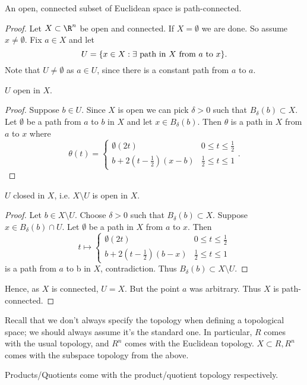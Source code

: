 \begin{proposition}                       %
An open, connected subset of Euclidean space is path-connected.
\end{proposition}
\begin{proof}
Let $X\subset \R^n$ be open and connected. If $X = \emptyset$ we are done. So assume $x\neq \emptyset$. Fix $a\in X$ and let \[ U = \{x\in X : \exists \textup{ path in } X \textup{ from } a \textup{ to } x\}. \]
Note that $U\neq \emptyset$ as $a\in U$, since  there is a constant path from $a$ to $a$.

\begin{claim}
    $U$ open in $X$.
\end{claim} 
\begin{proof}
Suppose $b\in U$. Since $X$ is open we can pick $\delta > 0$ such that $B_\delta(b) \subset X$. Let $\emptyset$ be a path from $a$ to $b$ in $X$ and let $x\in B_\delta(b)$. Then $\theta$ is a path in $X$ from $a$ to $x$ where 
\[
\theta(t) = \begin{cases}
\emptyset(2t) & 0\leq t \leq \frac{1}{2}\\
b + 2(t-\frac{1}{2})(x-b) & \frac{1}{2}\leq t \leq 1
\end{cases}.
\]
\end{proof}

\begin{claim}
    $U$ closed in $X$, i.e. $X\setminus U$ is open in $X$.
\end{claim} 

\begin{proof}
Let $b \in X\setminus U$. Choose $\delta> 0$ such that $B_\delta(b) \subset X.$ Suppose $x\in B_\delta (b)\cap U$. Let $\emptyset$ be a path in $X$ from $a$ to $x$. Then 
\[
t \mapsto \begin{cases}
\emptyset(2t) & 0\leq t \leq \frac{1}{2}\\
b + 2(t-\frac{1}{2})(b-x) & \frac{1}{2}\leq t \leq 1
\end{cases}
\]
is a path from $a$ to b in $X$, contradiction. Thus $B_\delta (b) \subset X\setminus U$.
\end{proof}
Hence, as $X$ is connected, $U=X$. But the point $a$ was arbitrary. Thus $X$ is path-connected.
\end{proof}

\begin{remark}
Recall that we don't always specify the topology when defining a topological space; we should always assume it's the standard one. In particular, $R$ comes with the usual topology, and $R^n$ comes with the Euclidean topology. $X\subset R,R^n$ comes with the subspace topology from the above.

Products/Quotients come with the product/quotient topology respectively.
\end{remark}


